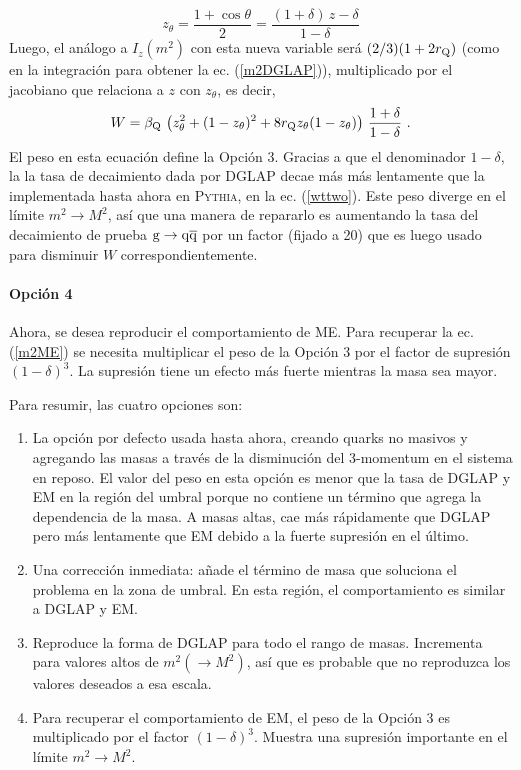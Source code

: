 \documentclass[a4paper,12pt]{article}
\begin{document}
\begin{equation}
z_{\theta} = \frac{1 + \cos\theta}{2} = 
\frac{ (1 + \delta) \, z - \delta}{1 - \delta}
\end{equation}Luego, el análogo a $I_z(m^2)$ con esta nueva variable será $(2/3)(1+2r_{\mathrm Q})$ (como en la integración para obtener la ec. (\ref{m2DGLAP})), multiplicado por el jacobiano que relaciona a $z$ con $z_\theta$, es decir,
\begin{equation}
W = \beta_{{\mathrm Q}} \, \left( z_{\theta}^2 + (1 - z_{\theta})^2 + 8 r_{{\mathrm Q}} z_{\theta} 
(1 - z_{\theta}) \right) \, \frac{1 + \delta}{1 - \delta} ~.
\label{wttwo}
\end{equation}
El peso en esta ecuación define la Opción 3. Gracias a que el denominador $1-\delta$, la la tasa de decaimiento dada por DGLAP decae más más lentamente que la implementada hasta ahora en \textsc{Pythia}, en la ec. (\ref{wttwo}). Este peso diverge en el límite $m^2\to M^2$, así que una manera de repararlo es aumentando la tasa del decaimiento de prueba ${\mathrm g}\to{\mathrm q}\overline{\mathrm q}$ por un factor (fijado a 20) que es luego usado para disminuir $W$ correspondientemente.

\paragraph{Opción 4}

Ahora, se desea reproducir el comportamiento de ME. Para recuperar la ec. (\ref{m2ME}) se necesita multiplicar el peso de la Opción 3 por el factor de supresión $(1-\delta)^3$. La supresión tiene un efecto más fuerte mientras la masa sea mayor.

Para resumir, las cuatro opciones son:

\begin{enumerate}
\item La opción por defecto usada hasta ahora, creando quarks no masivos y agregando las masas a través de la disminución del 3-momentum en el sistema en reposo. El valor del peso en esta opción es menor que la tasa de DGLAP y EM en la región del umbral porque no contiene un término que agrega la dependencia de la masa. A masas altas, cae más rápidamente que DGLAP pero más lentamente que EM debido a la fuerte supresión en el último.
\item Una corrección inmediata: añade el término de masa que soluciona el problema en la zona de umbral. En esta región, el comportamiento es similar a DGLAP y EM.
\item Reproduce la forma de DGLAP para todo el rango de masas. Incrementa para valores altos de $m^2(\to M^2)$, así que es probable que no reproduzca los valores deseados a esa escala.
\item Para recuperar el comportamiento de EM, el peso de la Opción 3 es multiplicado por el factor $(1-\delta)^3$. Muestra una supresión importante en el límite $m^2\to M^2$.
\end{enumerate}
\end{document}
